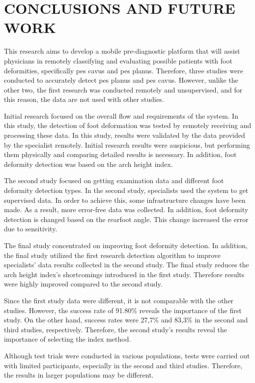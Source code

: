 \chapter{CONCLUSIONS AND FUTURE WORK}\label{chp:ConclusionsAndFutureWork}

This research aims to develop a mobile pre-diagnostic platform that will assist physicians in remotely classifying and evaluating possible patients with foot deformities, specifically pes cavus and pes planus. Therefore, three studies were conducted to accurately detect pes planus and pes cavus. However, unlike the other two, the first research was conducted remotely and unsupervised, and for this reason, the data are not used with other studies.

Initial research focused on the overall flow and requirements of the system. In this study, the detection of foot deformation was tested by remotely receiving and processing these data. In this study, results were validated by the data provided by the specialist remotely. Initial research results were auspicious, but performing them physically and comparing detailed results is necessary. In addition, foot deformity detection was based on the arch height index. 

The second study focused on getting examination data and different foot deformity detection types. In the second study, specialists used the system to get supervised data. In order to achieve this, some infrastructure changes have been made. As a result, more error-free data was collected. In addition, foot deformity detection is changed based on the rearfoot angle. This change increased the error due to sensitivity.

The final study concentrated on improving foot deformity detection. In addition, the final study utilized the first research detection algorithm to improve specialists' data results collected in the second study. The final study reduces the arch height index's shortcomings introduced in the first study. Therefore results were highly improved compared to the second study. 

Since the first study data were different, it is not comparable with the other studies. However, the success rate of 91.80\% reveals the importance of the first study. On the other hand, success rates were 27,7\% and 83,3\% in the second and third studies, respectively. Therefore, the second study's results reveal the importance of selecting the index method.

Although test trials were conducted in various populations, tests were carried out with limited participants, especially in the second and third studies. 
Therefore, the results in larger populations may be different.

